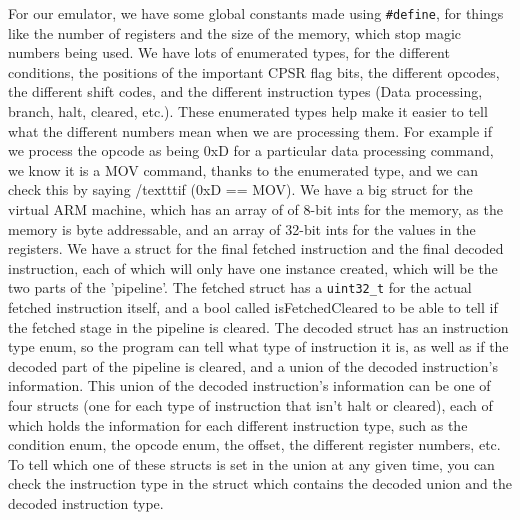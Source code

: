 \documentclass[a4wide, 10pt]{article}
\begin{document}
For our emulator, we have some global constants made using \texttt{\#define}, for things like the
 number of registers and the size of the memory, which stop magic numbers being used. We have
  lots of enumerated types, for the different conditions, the positions of the important CPSR
   flag bits, the different opcodes, the different shift codes, and the different instruction
    types (Data processing, branch, halt, cleared, etc.). These enumerated types help make it
     easier to tell what the different numbers mean when we are processing them. For example if
      we process the opcode as being 0xD for a particular data processing command, we know it is
       a MOV command, thanks to the enumerated type, and we can check this by saying /texttt{if
        (0xD == MOV)}. We have a big struct for the virtual ARM machine, which has an array of of
         8-bit ints for the memory, as the memory is byte addressable, and an array of 32-bit
          ints for the values in the registers. We have a struct for the final fetched
           instruction and the final decoded instruction, each of which will only have one
            instance created, which will be the two parts of the 'pipeline'. The fetched struct
             has a \texttt{uint32\_t} for the actual fetched instruction itself, and a bool
              called isFetchedCleared to be able to tell if the fetched stage in the pipeline is
               cleared. The decoded struct has an instruction type enum, so the program can tell
                what type of instruction it is, as well as if the decoded part of the pipeline is
                 cleared, and a union of the decoded instruction's information. This union of the
                  decoded instruction's information can be one of four structs (one for each type
                   of instruction that isn't halt or cleared), each of which holds the
                    information for each different instruction type, such as the condition enum,
                     the opcode enum, the offset, the different register numbers, etc. To tell
                      which one of these structs is set in the union at any given time, you can
                       check the instruction type in the struct which contains the decoded union
                        and the decoded instruction type. 
                        
\end{document}
